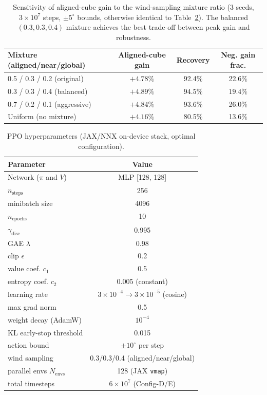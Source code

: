 \documentclass[final,5p,times]{elsarticle}
\begin{document}
\begin{table}[t]
\centering
\caption{Sensitivity of aligned-cube gain to the wind-sampling mixture ratio (3 seeds, $3{\times}10^{7}$ steps, $\pm5^\circ$ bounds, otherwise identical to Table~\ref{tab:hp}). The balanced $(0.3,0.3,0.4)$ mixture achieves the best trade-off between peak gain and robustness.}
\label{tab:mix_sensitivity}
\small
\begin{tabular}{lccc}
\toprule
Mixture (aligned/near/global) & Aligned-cube gain & Recovery & Neg. gain frac. \\
\midrule
0.5 / 0.3 / 0.2 (original) & $+4.78\%$ & 92.4\% & 22.6\% \\
0.3 / 0.3 / 0.4 (balanced)  & $\mathbf{+4.89\%}$ & $\mathbf{94.5\%}$ & $\mathbf{19.4\%}$ \\
0.7 / 0.2 / 0.1 (aggressive) & $+4.84\%$ & 93.6\% & 26.0\% \\
Uniform (no mixture) & $+4.16\%$ & 80.5\% & 13.6\% \\
\bottomrule
\end{tabular}
\end{table}

\begin{table}[t]
\centering
\caption{PPO hyperparameters (JAX/NNX on-device stack, optimal configuration).}
\label{tab:hp}
\small
\begin{tabular}{lc}
\toprule
Parameter & Value \\
\midrule
Network ($\pi$ and $V$) & MLP [128, 128] \\
$n_\mathrm{steps}$ & 256 \\
minibatch size & 4096 \\
$n_\mathrm{epochs}$ & 10 \\
$\gamma_\mathrm{disc}$ & 0.995 \\
GAE $\lambda$ & 0.98 \\
clip $\epsilon$ & 0.2 \\
value coef. $c_1$ & 0.5 \\
entropy coef. $c_2$ & 0.005 (constant) \\
learning rate & $3{\times}10^{-4}\rightarrow3{\times}10^{-5}$ (cosine) \\
max grad norm & 0.5 \\
weight decay (AdamW) & $10^{-4}$ \\
KL early-stop threshold & 0.015 \\
action bound & $\pm10^\circ$ per step \\
wind sampling & 0.3/0.3/0.4 (aligned/near/global) \\
parallel envs $N_\mathrm{envs}$ & 128 (JAX \texttt{vmap}) \\
total timesteps & $6{\times}10^{7}$ (Config-D/E) \\
\bottomrule
\end{tabular}
\end{table}
\end{document}
